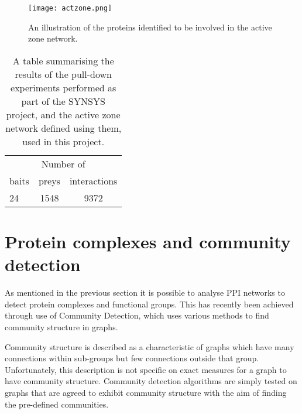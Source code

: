 \begin{figure}
    \centering
    \texttt{[image: actzone.png]}
    \caption{An illustration of the proteins identified to be involved in the active zone network\autocite{chua_architecture_2010}.}
    \label{fig:actzone}
\end{figure}

\begin{table}
    \centering
    \begin{tabular}{l c c} 
        \multicolumn{3}{c}{Number of} \\
        baits   & preys & interactions \\
        \hline
        24      & 1548  & 9372 \\
    \end{tabular}
    \caption{A table summarising the results of the pull-down experiments performed as part of the SYNSYS project\autocite{synsys}, and the active zone network defined using them, used in this project.}
    \label{tab:synsys}
\end{table}


\section{Protein complexes and community detection}

As mentioned in the previous section it is possible to analyse \ac{PPI} networks to detect protein complexes and functional groups. %
This has recently been achieved through use of Community Detection\autocites{chen_identifying_2013,wang_recent_2010}, which uses various methods to find community structure in graphs.

Community structure is described as a characteristic of graphs which have many connections within sub-groups but few connections outside that group\autocite{newman_communities_2012}.
Unfortunately, this description is not specific on exact measures for a graph to have community structure. %
Community detection algorithms are simply tested on graphs that are agreed to exhibit community structure with the aim of finding the pre-defined communities. %

